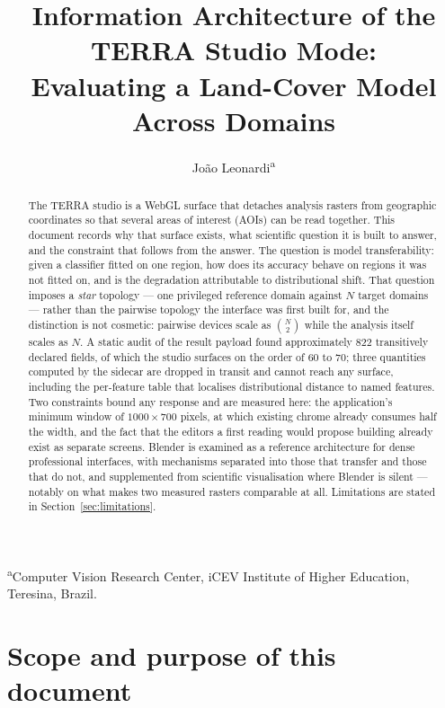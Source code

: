 \documentclass[11pt,a4paper]{article}
\title{Information Architecture of the TERRA Studio Mode:\\
Evaluating a Land-Cover Model Across Domains}
\author{Jo\~ao Leonardi\textsuperscript{a}}
\date{}
\begin{document}
\maketitle

\begin{center}
\small\textsuperscript{a}Computer Vision Research Center, iCEV Institute of
Higher Education, Teresina, Brazil.
\end{center}

\begin{abstract}
\noindent
The TERRA studio is a WebGL surface that detaches analysis rasters from
geographic coordinates so that several areas of interest (AOIs) can be read
together. This document records why that surface exists, what scientific
question it is built to answer, and the constraint that follows from the
answer. The question is model transferability: given a classifier fitted on one
region, how does its accuracy behave on regions it was not fitted on, and is
the degradation attributable to distributional shift. That question imposes a
\emph{star} topology --- one privileged reference domain against $N$ target
domains --- rather than the pairwise topology the interface was first built
for, and the distinction is not cosmetic: pairwise devices scale as
$\binom{N}{2}$ while the analysis itself scales as $N$. A static audit of the
result payload found approximately 822 transitively declared fields, of which
the studio surfaces on the order of 60 to 70; three quantities computed by the
sidecar are dropped in transit and cannot reach any surface, including the
per-feature table that localises distributional distance to named features. Two
constraints bound any response and are measured here: the application's minimum
window of $1000 \times 700$ pixels, at which existing chrome already consumes
half the width, and the fact that the editors a first reading would propose
building already exist as separate screens. Blender is examined as a reference
architecture for dense professional interfaces, with mechanisms separated into
those that transfer and those that do not, and supplemented from scientific
visualisation where Blender is silent --- notably on what makes two measured
rasters comparable at all. Limitations are stated in
Section~\ref{sec:limitations}.
\end{abstract}

\section{Scope and purpose of this document}
\end{document}
